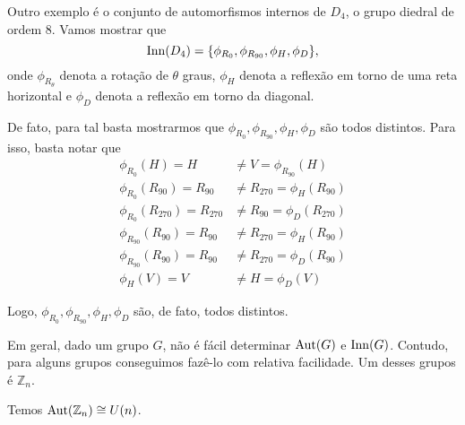 	\begin{example}
	Outro exemplo é o conjunto de automorfismos
	internos de $D_4$, o grupo diedral de ordem $8$. Vamos mostrar que
	\begin{equation*}
        \operatorname{Inn}(D_4) =
        \displaystyle{
        \left\{
        \phi_{R_0},\phi_{R_{90}},\phi_{H},\phi_{D}
        \right\}},
	\end{equation*}
	onde $\phi_{R_{\theta}}$ denota a rotação de $\theta$ graus, $\phi_H$ denota
	a reflexão em torno de uma reta horizontal e $\phi_D$ denota a reflexão em torno
	da diagonal.
	\par\vspace{0.3cm} De fato, para tal basta mostrarmos que 
	$\phi_{R_0}, \phi_{R_{90}}, \phi_{H}, \phi_{D}$ são todos distintos.
	Para isso, basta notar que
	\begin{align*}
        \phi_{R_{0}}(H) = H &\neq V = \phi_{R_{90}}(H) \\
        \phi_{R_{0}}(R_{90}) = R_{90} &\neq R_{270} = \phi_{H}(R_{90}) \\
        \phi_{R_{0}}(R_{270}) = R_{270} &\neq R_{90} = \phi_{D}(R_{270}) \\
        \phi_{R_{90}}(R_{90}) = R_{90} &\neq R_{270} = \phi_{H}(R_{90}) \\
        \phi_{R_{90}}(R_{90}) = R_{90} &\neq R_{270} = \phi_{D}(R_{90}) \\
        \phi_{H}(V) = V &\neq H = \phi_{D}(V)
	\end{align*}
	\par\vspace{0.3cm} Logo, $\phi_{R_0}, \phi_{R_{90}}, \phi_{H}, \phi_{D}$
	são, de fato, todos distintos.
	\end{example}
	\par\vspace{0.3cm} Em geral, dado um grupo $G$, não é fácil determinar
	$\operatorname{Aut}(G)$ e $\operatorname{Inn}(G)$. Contudo, para alguns grupos conseguimos fazê-lo 
	com relativa facilidade. Um desses grupos é $\mathbb{Z}_n$.
	\begin{theorem}
	\label{automorfismos de Z_n}
		Temos $\operatorname{Aut}(\mathbb{Z}_n) \cong U(n)$.
	\end{theorem}
